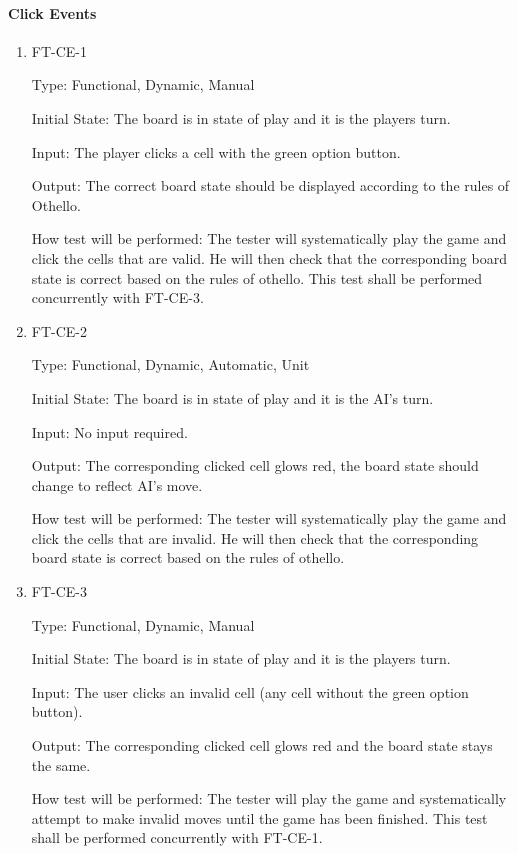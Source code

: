 \documentclass[12pt, titlepage]{article}
\begin{document}
\paragraph{Click Events}
\begin{enumerate}
	\item FT-CE-1

	      Type: Functional, Dynamic, Manual

	      Initial State: The board is in state of play and it is the players turn.

	      Input: The player clicks a cell with the green option button.

	      Output: The correct board state should be displayed according to the rules of  Othello.

	      How test will be performed: The tester will systematically play the game and click the cells that are valid. He will then check that the corresponding board state is correct  based on the rules of othello. This test shall be performed concurrently with FT-CE-3.

	\item FT-CE-2

	      Type: Functional, Dynamic, Automatic, Unit

	      Initial State: The board is in state of play and it is the AI's turn.

	      Input: No input required.

	      Output: The corresponding clicked cell glows red, the board state should change to reflect AI's move.

	      How test will be performed: The tester will systematically play the game and click the cells that are invalid. He will then check that the corresponding board state is correct  based on the rules of othello.

	\item FT-CE-3

	      Type: Functional, Dynamic, Manual

	      Initial State: The board is in state of play and it is the players turn.

	      Input: The user clicks an invalid cell (any cell without the green option button).

	      Output: The corresponding clicked cell glows red and the board state stays the same.

	      How test will be performed: The tester will play the game and systematically attempt to make invalid moves until the game has been finished. This test shall be performed concurrently with FT-CE-1.




\end{enumerate}
\end{document}
